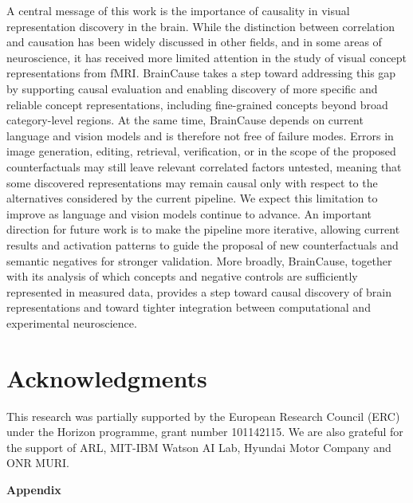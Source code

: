 \documentclass{llmxive}
\providecommand{\thefigure}{S\arabic{figure}}
\providecommand{\thetable}{T\arabic{table}}
\begin{document}
A central message of this work is the importance of causality in visual representation discovery in the brain. While the distinction between correlation and causation has been widely discussed in other fields, and in some areas of neuroscience, it has received more limited attention in the study of visual concept representations from fMRI. BrainCause takes a step toward addressing this gap by supporting causal evaluation and enabling discovery of more specific and reliable concept representations, including fine-grained concepts beyond broad category-level regions. At the same time, BrainCause depends on current language and vision models and is therefore not free of failure modes. Errors in image generation, editing, retrieval, verification, or in the scope of the proposed counterfactuals may still leave relevant correlated factors untested, meaning that some discovered representations may remain causal only with respect to the alternatives considered by the current pipeline. We expect this limitation to improve as language and vision models continue to advance. An important direction for future work is to make the pipeline more iterative, allowing current results and activation patterns to guide the proposal of new counterfactuals and semantic negatives for stronger validation. More broadly, BrainCause, together with its analysis of which concepts and negative controls are sufficiently represented in measured data, provides a step toward causal discovery of brain representations and toward tighter integration between computational and experimental neuroscience.



\section*{Acknowledgments}
This research was partially supported by the European Research Council (ERC) under the Horizon programme, grant number 101142115. We are also grateful for the support of ARL, MIT-IBM Watson AI Lab, Hyundai Motor Company and ONR MURI.









\appendix
\begin{center}
    {\LARGE \bfseries Appendix}
\end{center}
\renewcommand{\thefigure}{S\arabic{figure}}  
\renewcommand{\thetable}{T\arabic{table}}    

\setcounter{figure}{0} 
\setcounter{table}{0}
\end{document}
